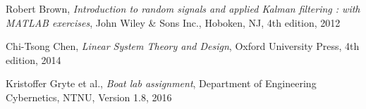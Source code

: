 \begin{thebibliography}{9}
  Robert Brown, 
  \emph{Introduction to random signals and applied Kalman filtering :  with MATLAB exercises},
  John Wiley \& Sons Inc., 
  Hoboken, 
  NJ, 
  4th edition, 
  2012

  Chi-Tsong Chen,
  \emph{Linear System Theory and Design},
  Oxford University Press,
  4th edition,
  2014
  
  Kristoffer Gryte et al.,
  \emph{Boat lab assignment},
  Department of Engineering Cybernetics,
  NTNU,
  Version 1.8,
  2016
    
\end{thebibliography}